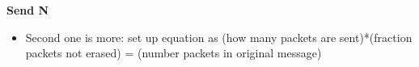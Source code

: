 \item \textbf{Send N}
\begin{itemize}
\item Second one is more: set up equation as (how many packets are sent)*(fraction packets not erased) = (number packets in original message)
\end{itemize}